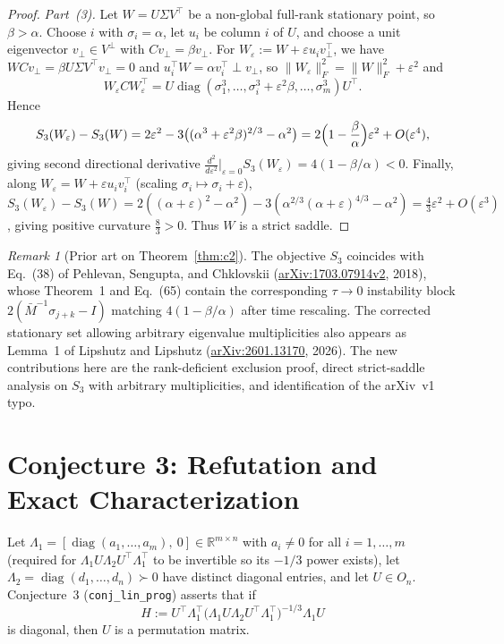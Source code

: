 \documentclass[11pt]{article}
\theoremstyle{plain}
\theoremstyle{definition}
\theoremstyle{remark}
\newtheorem{remark}{Remark}
\DeclareMathOperator{\diag}{diag}
\begin{document}
\begin{proof}
\emph{Part~(3).} Let $W = U\Sigma V^\top$ be a non-global full-rank stationary point, so $\beta > \alpha$. Choose $i$ with $\sigma_i = \alpha$, let $u_i$ be column $i$ of $U$, and choose a unit eigenvector $v_\perp \in V^\perp$ with $Cv_\perp = \beta v_\perp$. For $W_\varepsilon := W + \varepsilon u_i v_\perp^\top$, we have $W C v_\perp = \beta U \Sigma V^\top v_\perp = 0$ and $u_i^\top W = \alpha v_i^\top \perp v_\perp$, so $\|W_\varepsilon\|_F^2 = \|W\|_F^2 + \varepsilon^2$ and
\[
W_\varepsilon C W_\varepsilon^\top = U\diag(\sigma_1^3, \dots, \sigma_i^3 + \varepsilon^2 \beta, \dots, \sigma_m^3)U^\top.
\]
Hence
\[
S_3(W_\varepsilon) - S_3(W)
= 2\varepsilon^2 - 3\bigl((\alpha^3 + \varepsilon^2\beta)^{2/3} - \alpha^2\bigr)
= 2\Bigl(1 - \frac{\beta}{\alpha}\Bigr)\varepsilon^2 + O(\varepsilon^4),
\]
giving second directional derivative $\frac{d^2}{d\varepsilon^2}\big|_{\varepsilon=0} S_3(W_\varepsilon) = 4(1 - \beta/\alpha) < 0$.
Finally, along $W_\varepsilon = W + \varepsilon u_i v_i^\top$ (scaling $\sigma_i \mapsto \sigma_i + \varepsilon$), $S_3(W_\varepsilon) - S_3(W) = 2((\alpha+\varepsilon)^2 - \alpha^2) - 3(\alpha^{2/3}(\alpha+\varepsilon)^{4/3} - \alpha^2) = \frac{4}{3}\varepsilon^2 + O(\varepsilon^3)$, giving positive curvature $\frac{8}{3} > 0$. Thus $W$ is a strict saddle.
\end{proof}

\begin{remark}[Prior art on Theorem~\ref{thm:c2}]
The objective $S_3$ coincides with Eq.~(38) of Pehlevan, Sengupta, and Chklovskii (\href{https://arxiv.org/abs/1703.07914}{arXiv:1703.07914v2}, 2018), whose Theorem~1 and Eq.~(65) contain the corresponding $\tau \to 0$ instability block $2(\bar{M}^{-1}\sigma_{j+k} - I)$ matching $4(1-\beta/\alpha)$ after time rescaling. The corrected stationary set allowing arbitrary eigenvalue multiplicities also appears as Lemma~1 of Lipshutz and Lipshutz (\href{https://arxiv.org/abs/2601.13170}{arXiv:2601.13170}, 2026). The new contributions here are the rank-deficient exclusion proof, direct strict-saddle analysis on $S_3$ with arbitrary multiplicities, and identification of the arXiv~v1 typo.
\end{remark}

\section{Conjecture 3: Refutation and Exact Characterization}

Let $\Lambda_1 = [\diag(a_1, \dots, a_m),\ 0] \in \mathbb{R}^{m \times n}$ with $a_i \neq 0$ for all $i = 1, \dots, m$ (required for $\Lambda_1 U \Lambda_2 U^\top \Lambda_1^\top$ to be invertible so its $-1/3$ power exists), let $\Lambda_2 = \diag(d_1, \dots, d_n) \succ 0$ have distinct diagonal entries, and let $U \in O_n$. Conjecture~3 (\texttt{conj\_lin\_prog}) asserts that if
\[
H := U^\top \Lambda_1^\top \bigl(\Lambda_1 U \Lambda_2 U^\top \Lambda_1^\top\bigr)^{-1/3} \Lambda_1 U
\]
is diagonal, then $U$ is a permutation matrix.
\end{document}
